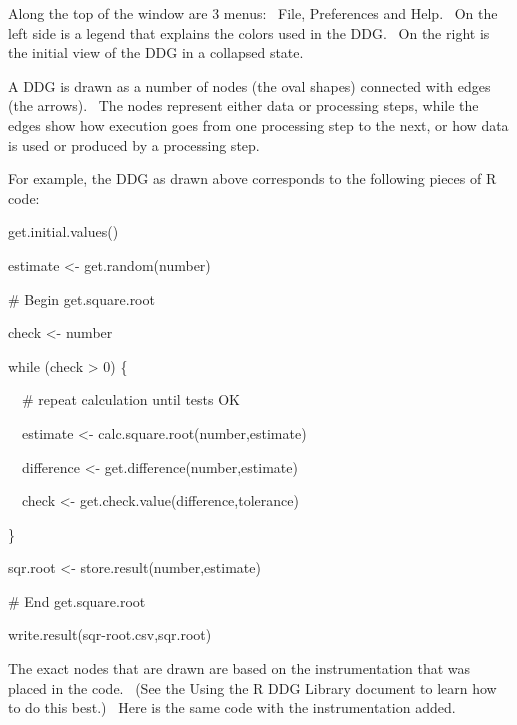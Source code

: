 \documentclass[letterpaper]{article}
\begin{document}
{\mdseries\upshape\color{black}
Along the top of the window are 3 menus: \ File, Preferences and Help. \ On the left side is a legend that explains the colors used in the DDG. \ On the right is the initial view of the DDG in a collapsed state.}

{\mdseries\upshape\color{black}
A DDG is drawn as a number of nodes (the oval shapes) connected with edges (the arrows). \ The nodes represent either data or processing steps, while the edges show how execution goes from one processing step to the next, or how data is used or produced by a processing step.}

{\mdseries\upshape\color{black}
For example, the DDG as drawn above corresponds to the following pieces of R code:}

{\color{black}
get.initial.values()}

{\mdseries\upshape\color{black}
estimate {\textless}- get.random(number)}


\bigskip

{\mdseries\upshape\color{black}
\# Begin get.square.root}

{\mdseries\upshape\color{black}
check {\textless}- number}

{\mdseries\upshape\color{black}
\textcolor[rgb]{0.49803922,0.0,0.37254903}{while} (check \textcolor[rgb]{0.62352943,0.24705882,0.49803922}{{\textgreater}} \textcolor[rgb]{0.0,0.0,0.49803922}{0}) \{}

{\mdseries\upshape\color{black}
\ \ \# repeat calculation until tests OK}

{\mdseries\upshape\color{black}
\ \ estimate {\textless}- calc.square.root(number,estimate)}

{\mdseries\upshape\color{black}
\ \ difference {\textless}- get.difference(number,estimate)}

{\mdseries\upshape\color{black}
\ \ check {\textless}- get.check.value(difference,tolerance)}

{\mdseries\upshape\color{black}
\}}

{\mdseries\upshape\color{black}
sqr.root {\textless}- store.result(number,estimate)}

{\mdseries\upshape\color{black}
\# End get.square.root}


\bigskip

{\mdseries\upshape\color{black}
write.result({\textquotedbl}sqr-root.csv{\textquotedbl},sqr.root)}

{\mdseries\upshape\color{black}
The exact nodes that are drawn are based on the instrumentation that was placed in the code. \ (See the Using the R DDG Library document to learn how to do this best.) \ Here is the same code with the instrumentation added.}
\end{document}
